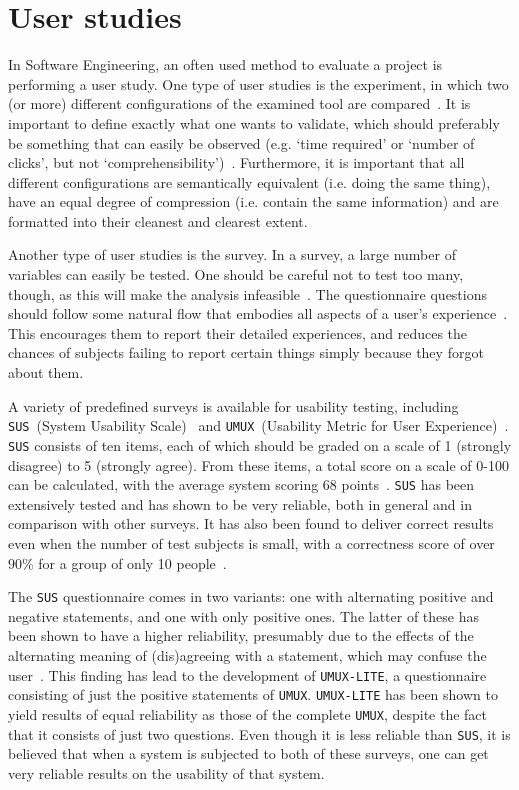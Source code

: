 \section{User studies}
In Software Engineering, an often used method to evaluate a project is performing a user study. One type of user studies is the experiment, in which two (or more) different configurations of the examined tool are compared~\cite{wohlin2003empirical}. It is important to define exactly what one wants to validate, which should preferably be something that can easily be observed (e.g. `time required' or `number of clicks', but not `comprehensibility')~\cite{stein2009assessing}. Furthermore, it is important that all different configurations are semantically equivalent (i.e. doing the same thing), have an equal degree of compression (i.e. contain the same information) and are formatted into their cleanest and clearest extent.

Another type of user studies is the survey. In a survey, a large number of variables can easily be tested. One should be careful not to test too many, though, as this will make the analysis infeasible~\cite{wohlin2003empirical}. The questionnaire questions should follow some natural flow that embodies all aspects of a user's experience~\cite{tuch2013analyzing}. This encourages them to report their detailed experiences, and reduces the chances of subjects failing to report certain things simply because they forgot about them.

A variety of predefined surveys is available for usability testing, including \verb|SUS|~(System Usability Scale)~\cite{brooke2013sus} and \verb|UMUX|~(Usability Metric for User Experience)~\cite{lewis2013umux}. \verb|SUS| consists of ten items, each of which should be graded on a scale of 1 (strongly disagree) to 5 (strongly agree). From these items, a total score on a scale of 0-100 can be calculated, with the average system scoring 68 points~\cite{sauro2011measuring}. \verb|SUS| has been extensively tested and has shown to be very reliable, both in general and in comparison with other surveys. It has also been found to deliver correct results even when the number of test subjects is small, with a correctness score of over $90\%$ for a group of only 10 people~\cite{tullis2004comparison}.

The \verb|SUS| questionnaire comes in two variants: one with alternating positive and negative statements, and one with only positive ones. The latter of these has been shown to have a higher reliability, presumably due to the effects of the alternating meaning of (dis)agreeing with a statement, which may confuse the user~\cite{lewis2013umux}. This finding has lead to the development of \verb|UMUX-LITE|, a questionnaire consisting of just the positive statements of \verb|UMUX|. \verb|UMUX-LITE| has been shown to yield results of equal reliability as those of the complete \verb|UMUX|, despite the fact that it consists of just two questions. Even though it is less reliable than \verb|SUS|, it is believed that when a system is subjected to both of these surveys, one can get very reliable results on the usability of that system.

